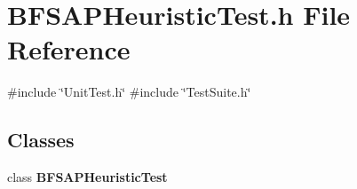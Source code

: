 \section{B\+F\+S\+A\+P\+Heuristic\+Test.\+h File Reference}
\label{BFSAPHeuristicTest_8h}
{\ttfamily \#include \char`\"{}Unit\+Test.\+h\char`\"{}}\newline
{\ttfamily \#include \char`\"{}Test\+Suite.\+h\char`\"{}}\newline
\subsection*{Classes}
\begin{DoxyCompactItemize}
\item 
class \textbf{ B\+F\+S\+A\+P\+Heuristic\+Test}
\end{DoxyCompactItemize}
